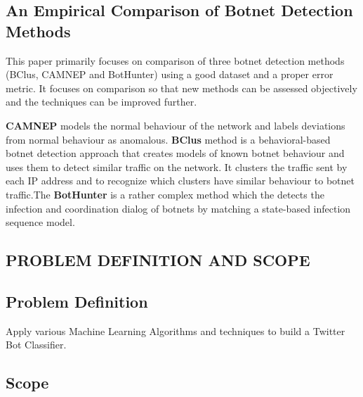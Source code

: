 \documentclass[a4paper, 12pt]{article}
\begin{document}
\subsection{An Empirical Comparison of Botnet Detection Methods}
\par
\hspace{1cm}
This paper primarily focuses on comparison of three botnet detection methods (BClus, CAMNEP and BotHunter) using a good dataset and a proper error metric. It focuses on comparison so that new methods can be assessed objectively and the techniques can be improved further. 
\par
\hspace{0.5cm}
\textbf{CAMNEP}  models the normal behaviour of the network and labels deviations from normal behaviour as anomalous. \textbf{BClus} method is a behavioral-based botnet detection approach that creates models of known botnet behaviour and uses them to detect similar traffic on the network. It clusters the traffic sent by each IP address and to recognize which clusters have similar behaviour to botnet traffic.The \textbf{BotHunter} is a rather complex method which the detects the infection and coordination dialog of botnets by matching a state-based infection sequence model. 


\newpage
\begin{center}
\section{PROBLEM DEFINITION AND SCOPE}
\end{center}

\subsection{Problem Definition}

\hspace{1cm}
Apply various Machine Learning Algorithms and techniques to build a Twitter Bot Classifier.

\subsection{Scope}
\end{document}
